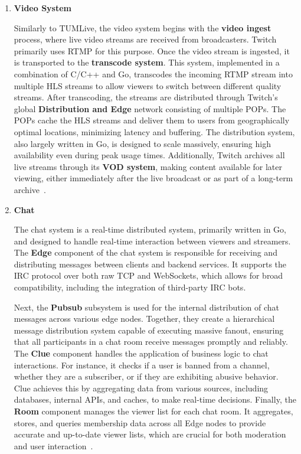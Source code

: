 \begin{enumerate}
    \item \textbf{Video System}
    
    Similarly to TUMLive, the video system begins with the \textbf{video ingest} process, where live video streams are received from broadcasters. Twitch primarily uses \ac{RTMP} for this purpose. Once the video stream is ingested, it is transported to the \textbf{transcode system}. This system, implemented in a combination of C/C++ and Go, transcodes the incoming \ac{RTMP} stream into multiple \ac{HLS} streams to allow viewers to switch between different quality streams.
    After transcoding, the streams are distributed through Twitch's global \textbf{Distribution and Edge} network consisting of multiple \ac{POPs}. The \ac{POPs} cache the \ac{HLS} streams and deliver them to users from geographically optimal locations, minimizing latency and buffering. The distribution system, also largely written in Go, is designed to scale massively, ensuring high availability even during peak usage times. Additionally, Twitch archives all live streams through its \textbf{\ac{VOD} system}, making content available for later viewing, either immediately after the live broadcast or as part of a long-term archive~\parencite{twitch_engineering}.
    
    \item \textbf{Chat}

    The chat system is a real-time distributed system, primarily written in Go, and designed to handle real-time interaction between viewers and streamers. The \textbf{Edge} component of the chat system is responsible for receiving and distributing messages between clients and backend services. It supports the \ac{IRC} protocol over both raw TCP and WebSockets, which allows for broad compatibility, including the integration of third-party \ac{IRC} bots.
    
    Next, the \textbf{Pubsub} subsystem is used for the internal distribution of chat messages across various edge nodes. Together, they create a hierarchical message distribution system capable of executing massive fanout, ensuring that all participants in a chat room receive messages promptly and reliably. The \textbf{Clue} component handles the application of business logic to chat interactions. For instance, it checks if a user is banned from a channel, whether they are a subscriber, or if they are exhibiting abusive behavior. Clue achieves this by aggregating data from various sources, including databases, internal \ac{API}s, and caches, to make real-time decisions. Finally, the \textbf{Room} component manages the viewer list for each chat room. It aggregates, stores, and queries membership data across all Edge nodes to provide accurate and up-to-date viewer lists, which are crucial for both moderation and user interaction~\parencite{twitch_chat}.


\end{enumerate}
